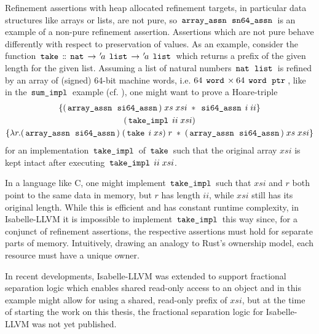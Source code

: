 Refinement assertions with heap allocated refinement targets, in particular data structures like arrays or lists, are not pure, so $\,\text{\ttfamily array\_assn}\, \; \,\text{\ttfamily sn64\_assn}\,$ is an example of a non-pure refinement assertion.
Assertions which are not pure behave differently with respect to preservation of values.
As an example, consider the function $\,\text{\ttfamily take}\, \mathrel{\mathord{:}\mkern-1.2mu\mathord{:}} \,\text{\ttfamily nat}\, \rightarrow {\mskip2mu '\mskip-2mua} \; \,\text{\ttfamily list}\, \rightarrow {\mskip2mu '\mskip-2mua} \; \,\text{\ttfamily list}\,$ which returns a prefix of the given length for the given list.
Assuming a list of natural numbers $\,\text{\ttfamily nat}\, \; \,\text{\ttfamily list}\,$ is refined by an array of (signed) 64-bit machine words, i.e. $64 \; \,\text{\ttfamily word}\, \times 64 \; \,\text{\ttfamily word}\, \; \,\text{\ttfamily ptr}\,$, like in the $\,\text{\ttfamily sum\_impl}\,$ example (cf. ), one might want to prove a Hoare-triple
\begin{gather*}
	\{(\,\text{\ttfamily array\_assn}\, \; \,\text{\ttfamily si64\_assn}\,) \; xs \; xsi \; \ast \; \,\text{\ttfamily si64\_assn}\, \; i \; ii\} \\
	(\,\text{\ttfamily take\_impl}\, \; ii \; xsi) \\
	\{\lambda r. (\,\text{\ttfamily array\_assn}\, \; \,\text{\ttfamily si64\_assn}\,) \; (\,\text{\ttfamily take}\, \; i \; xs) \; r \; \ast \; (\,\text{\ttfamily array\_assn}\, \; \,\text{\ttfamily si64\_assn}\,) \; xs \; xsi\}
\end{gather*}
for an implementation $\,\text{\ttfamily take\_impl}\,$ of $\,\text{\ttfamily take}\,$ such that the original array $xsi$ is kept intact after executing $\,\text{\ttfamily take\_impl}\, \; ii \; xsi$.

In a language like C, one might implement $\,\text{\ttfamily take\_impl}\,$ such that $xsi$ and $r$ both point to the same data in memory, but $r$ has length $ii$, while $xsi$ still has its original length.
While this is efficient and has constant runtime complexity, in Isabelle-LLVM it is impossible to implement $\,\text{\ttfamily take\_impl}\,$ this way since, for a conjunct of refinement assertions, the respective assertions must hold for separate parts of memory.
Intuitively, drawing an analogy to Rust's ownership model, each resource must have a unique owner.

In recent developments, Isabelle-LLVM was extended to support fractional separation logic \cite{isabelle-llvm-fractional} which enables shared read-only access to an object and in this example might allow for using a shared, read-only prefix of $xsi$, but at the time of starting the work on this thesis, the fractional separation logic for Isabelle-LLVM was not yet published.

